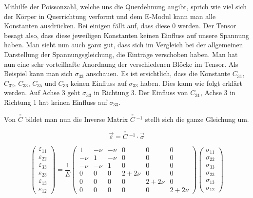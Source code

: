 Mithilfe der Poissonzahl, welche uns die Querdehnung angibt,
sprich wie viel sich der Körper in Querrichtung verformt und dem E-Modul kann man alle Konstanten ausdrücken.
Bei einigen fällt auf, dass diese 0 werden. Der Tensor besagt also,
dass diese jeweiligen Konstanten keinen Einfluss auf unsere Spannung haben.
Man sieht nun auch ganz gut, dass sich im Vergleich bei der allgemeinen Darstellung der Spannungsgleichung,
die Einträge verschoben haben. Man hat nun eine sehr vorteilhafte Anordnung der verschiedenen Blöcke im Tensor.
Als Beispiel kann man sich $\sigma_{33}$ anschauen.
Es ist ersichtlich, dass die Konstante $C_{31}$, $C_{32}$, $C_{33}$, $C_{35}$  und $C_{36}$ keinen Einfluss auf $\sigma_{33}$ haben.
Dies kann wie folgt erklärt werden. Auf Achse 3 geht $\sigma_{33}$ in Richtung 3.
Der Einfluss von $C_{31}$, Achse 3 in Richtung 1 hat keinen Einfluss auf $\sigma_{33}$.

Von  $\overline{\overline{C}}$ bildet man nun die Inverse Matrix $\overline{\overline{C}}~^{-1}$ stellt sich die ganze Gleichung um.

\[
\vec{\varepsilon}
=
\overline{\overline{C}}~^{-1}\cdot \vec{\sigma}
\]

\[
\begin{pmatrix}
	\varepsilon_{11}\\
	\varepsilon_{22}\\
	\varepsilon_{33}\\
	\varepsilon_{23}\\
	\varepsilon_{13}\\
	\varepsilon_{12}
\end{pmatrix}
=
\frac{1}{E}
\begin{pmatrix}
	   1 & -\nu & -\nu & 0      & 0      & 0     \\
	-\nu &    1 & -\nu & 0      & 0      & 0     \\
	-\nu & -\nu &    1 & 0      & 0      & 0     \\
 	   0 &    0 &    0 & 2+2\nu & 0      & 0     \\
	   0 &    0 &    0 &      0 & 2+2\nu & 0     \\
	   0 &    0 &    0 &      0 & 0      & 2+2\nu
\end{pmatrix}
\begin{pmatrix}
	\sigma_{11}\\
	\sigma_{22}\\
	\sigma_{33}\\
	\sigma_{23}\\
	\sigma_{13}\\
	\sigma_{12}
\end{pmatrix}
\]

